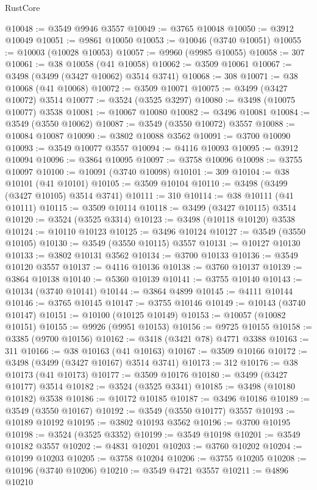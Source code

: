 \begin{lexlean}{RustCore}
\begin{coremodule}
@10048 := @3549 @9946 @3557
@10049 := @3765 @10048
@10050 := @3912 @10049
@10051 := @9861 @10050
@10053 := @10046 (@3740 @10051)
@10055 := @10003 (@10028 @10053)
@10057 := @9960 (@9985 @10055)
@10058 := 307
@10061 := @38 @10058 (@41 @10058)
@10062 := @3509 @10061
@10067 := @3498 (@3499 (@3427 @10062) @3514 @3741)
@10068 := 308
@10071 := @38 @10068 (@41 @10068)
@10072 := @3509 @10071
@10075 := @3499 (@3427 @10072) @3514
@10077 := @3524 (@3525 @3297)
@10080 := @3498 (@10075 @10077) @3538
@10081 := @10067 @10080
@10082 := @3496 @10081
@10084 := @3549 (@3550 @10062)
@10087 := @3549 (@3550 @10072) @3557
@10088 := @10084 @10087
@10090 := @3802 @10088 @3562
@10091 := @3700 @10090
@10093 := @3549 @10077 @3557
@10094 := @4116 @10093
@10095 := @3912 @10094
@10096 := @3864 @10095
@10097 := @3758 @10096
@10098 := @3755 @10097
@10100 := @10091 (@3740 @10098)
@10101 := 309
@10104 := @38 @10101 (@41 @10101)
@10105 := @3509 @10104
@10110 := @3498 (@3499 (@3427 @10105) @3514 @3741)
@10111 := 310
@10114 := @38 @10111 (@41 @10111)
@10115 := @3509 @10114
@10118 := @3499 (@3427 @10115) @3514
@10120 := @3524 (@3525 @3314)
@10123 := @3498 (@10118 @10120) @3538
@10124 := @10110 @10123
@10125 := @3496 @10124
@10127 := @3549 (@3550 @10105)
@10130 := @3549 (@3550 @10115) @3557
@10131 := @10127 @10130
@10133 := @3802 @10131 @3562
@10134 := @3700 @10133
@10136 := @3549 @10120 @3557
@10137 := @4116 @10136
@10138 := @3760 @10137
@10139 := @3864 @10138
@10140 := @5360 @10139
@10141 := @3755 @10140
@10143 := @10134 (@3740 @10141)
@10144 := @3864 @4899
@10145 := @4111 @10144
@10146 := @3765 @10145
@10147 := @3755 @10146
@10149 := @10143 (@3740 @10147)
@10151 := @10100 (@10125 @10149)
@10153 := @10057 (@10082 @10151)
@10155 := @9926 (@9951 @10153)
@10156 := @9725 @10155
@10158 := @3385 (@9700 @10156)
@10162 := @3418 (@3421 @78) @4771 @3388
@10163 := 311
@10166 := @38 @10163 (@41 @10163)
@10167 := @3509 @10166
@10172 := @3498 (@3499 (@3427 @10167) @3514 @3741)
@10173 := 312
@10176 := @38 @10173 (@41 @10173)
@10177 := @3509 @10176
@10180 := @3499 (@3427 @10177) @3514
@10182 := @3524 (@3525 @3341)
@10185 := @3498 (@10180 @10182) @3538
@10186 := @10172 @10185
@10187 := @3496 @10186
@10189 := @3549 (@3550 @10167)
@10192 := @3549 (@3550 @10177) @3557
@10193 := @10189 @10192
@10195 := @3802 @10193 @3562
@10196 := @3700 @10195
@10198 := @3524 (@3525 @3352)
@10199 := @3549 @10198
@10201 := @3549 @10182 @3557
@10202 := @4831 @10201
@10203 := @3760 @10202
@10204 := @10199 @10203
@10205 := @3758 @10204
@10206 := @3755 @10205
@10208 := @10196 (@3740 @10206)
@10210 := @3549 @4721 @3557
@10211 := @4896 @10210

\end{coremodule}
\end{lexlean}
